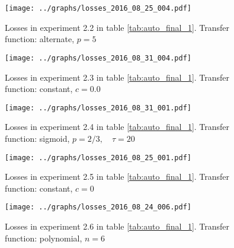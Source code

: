       \begin{figure}[!h]
      \centering
      \texttt{[image: ../graphs/losses\_2016\_08\_25\_004.pdf]}
      \caption{Losses in experiment 2.2 in table \ref{tab:auto_final_1}. Transfer function: alternate, $p=5$}
      \label{fig:alternate}
      \end{figure}

      \begin{figure}[!h]
      \centering \texttt{[image: ../graphs/losses\_2016\_08\_31\_004.pdf]}
      \caption{Losses in experiment 2.3 in table \ref{tab:auto_final_1}. Transfer function: constant, $c=0.0$}
      \label{fig:alternate} \end{figure}

      \begin{figure}[!h]
      \centering
      \texttt{[image: ../graphs/losses\_2016\_08\_31\_001.pdf]}
      \caption{Losses in experiment 2.4 in table \ref{tab:auto_final_1}. Transfer function: sigmoid, $p=2/3,\quad \tau=20$}
      \label{fig:alternate}
      \end{figure}

      \begin{figure}[!h]
      \centering
      \texttt{[image: ../graphs/losses\_2016\_08\_25\_001.pdf]}
      \caption{Losses in experiment 2.5 in table \ref{tab:auto_final_1}. Transfer function: constant, $c=0$}
      \label{fig:alternate}
      \end{figure}

      \begin{figure}[!h]
      \centering
      \texttt{[image: ../graphs/losses\_2016\_08\_24\_006.pdf]}
      \caption{Losses in experiment 2.6 in table \ref{tab:auto_final_1}. Transfer function: polynomial, $n=6$}
      \label{fig:alternate}
      \end{figure}
